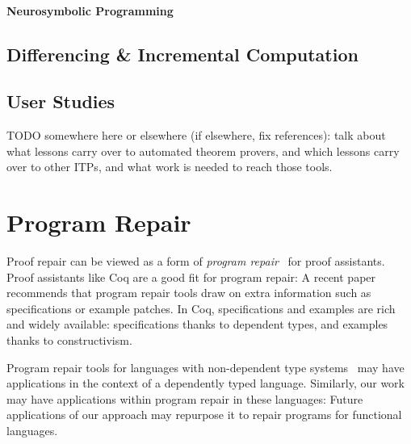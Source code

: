 \paragraph{Neurosymbolic Programming}

\subsection{Differencing \& Incremental Computation}
\label{sec:diff-incremental}

\subsection{User Studies}
\label{sec:user-studies}


\iffalse

TODO somewhere here or elsewhere (if elsewhere, fix references): talk about what lessons carry over to automated theorem provers,
and which lessons carry over to other ITPs, and what work is needed to reach those tools.

\section{Program Repair}


Proof repair can be viewed as a form of \textit{program repair}~\cite{Monperrus:2018:ASR:3177787.3105906, Gazzola:2018:ASR:3180155.3182526}
for proof assistants.
Proof assistants like Coq are a good fit for program repair: A recent paper~\cite{Qi:2015:APP:2771783.2771791} 
recommends that program repair tools draw on extra information
such as specifications or example patches. In Coq, specifications and examples 
are rich and widely available: specifications thanks to dependent types,
and examples thanks to constructivism.


Program repair tools for 
languages with non-dependent type 
systems~\cite{Pei:2014:APR:2731750.2731779, Long:2016:APG:2837614.2837617, Le:2017:SSS:3106237.3106309, Mechtaev:2016:ASM:2884781.2884807, Monperrus2015} 
may have applications in the context of a dependently typed language.
Similarly, our work may have applications within program repair in these languages:
Future applications of our approach may repurpose it to repair programs for functional languages.


